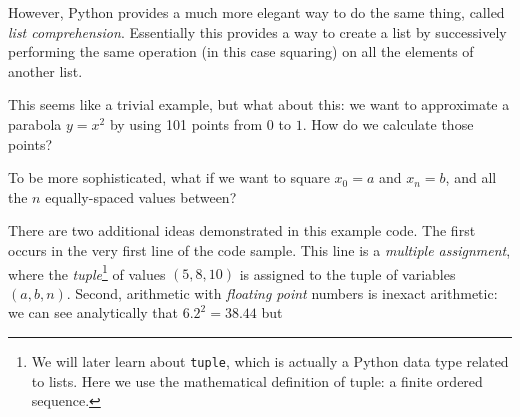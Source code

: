 \documentclass[m3380-lec-main.tex]{subfiles}
\begin{document}
\noindent
However, Python provides a much more elegant way to do the same thing, called \emph{list comprehension}. Essentially this provides a way to create a list by successively performing the same operation (in this case squaring) on all the elements of another list.

\noindent
This seems like a trivial example, but what about this: we want to approximate a parabola $y=x^2$ by using 101 points from $0$ to $1$. How do we calculate those points?

\noindent
To be more sophisticated, what if we want to square $x_0=a$ and $x_n=b$, and all the $n$ equally-spaced values between?\medskip

\noindent There are two additional ideas demonstrated in this example code. The first occurs in the very first line of the code sample.
\smallskip\noindent
This line is a \emph{multiple assignment}, where the \emph{tuple}\footnote{We will later learn about \texttt{tuple}, which is actually a Python data type related to lists. Here we use the mathematical definition of tuple: a finite ordered sequence.} of values $(5,8,10)$ is assigned to the tuple of variables $(a,b,n)$. Second, arithmetic with \emph{floating point} numbers is inexact arithmetic:
we can see analytically that $6.2^2=38.44$ but 
\end{document}
